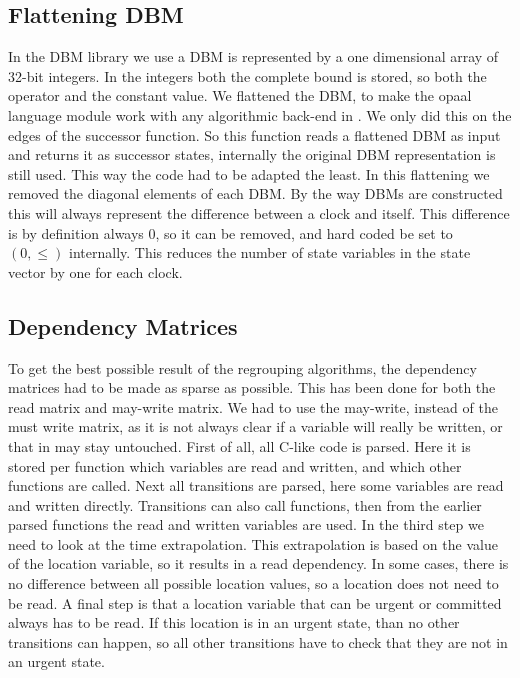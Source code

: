 \subsection{Flattening DBM}
In the DBM library we use a DBM is represented by a one dimensional array of 32-bit integers. In the integers both the complete bound is stored, so both the operator and the constant value. We flattened the DBM, to make the opaal language module work with any algorithmic back-end in \ltsmin{}. We only did this on the edges of the successor function. So this function reads a flattened DBM as input and returns it as successor states, internally the original DBM representation is still used. This way the code had to be adapted the least. In this flattening we removed the diagonal elements of each DBM. By the way DBMs are constructed this will always represent the difference between a clock and itself. This difference is by definition always 0, so it can be removed, and hard coded be set to $(0,\leq)$ internally. This reduces the number of state variables in the state vector by one for each clock.

\subsection{Dependency Matrices}
To get the best possible result of the regrouping algorithms, the dependency matrices had to be made as sparse as possible. This has been done for both the read matrix and may-write matrix. We had to use the may-write, instead of the must write matrix, as it is not always clear if a variable will really be written, or that in may stay untouched. First of all, all C-like code is parsed. Here it is stored per function which variables are read and written, and which other functions are called. Next all transitions are parsed, here some variables are read and written directly. Transitions can also call functions, then from the earlier parsed functions the read and written variables are used. In the third step we need to look at the time extrapolation. This extrapolation is based on the value of the location variable, so it results in a read dependency. In some cases, there is no difference between all possible location values, so a location does not need to be read. A final step is that a location variable that can be urgent or committed always has to be read. If this location is in an urgent state, than no other transitions can happen, so all other transitions have to check that they are not in an urgent state.

